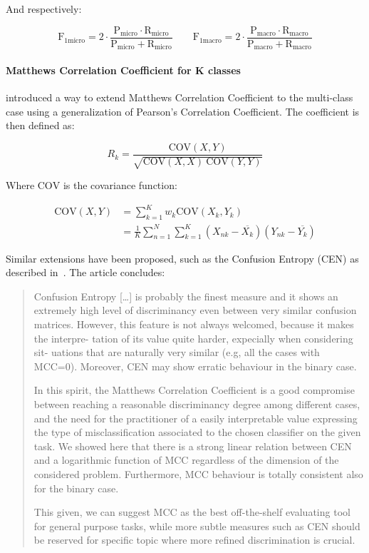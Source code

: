And respectively:

\begin{equation}
  \text{F}_{1 \text{micro}} = 2 \cdot \frac{\text{P}_{\text{micro}} \cdot \text{R}_{\text{micro}} }{\text{P}_{\text{micro}} + \text{R}_{\text{micro}} } \qquad
  \text{F}_{1 \text{macro}} = 2 \cdot \frac{\text{P}_{\text{macro}} \cdot \text{R}_{\text{macro}} }{\text{P}_{\text{macro}} + \text{R}_{\text{macro}} }
\end{equation}

\paragraph{Matthews Correlation Coefficient for K classes}
\label{par:Matthews Correlation Coefficient for K classes}

\cite{Gorodkin:2004aa} introduced a way to extend Matthews Correlation Coefficient to the multi-class case using a generalization of Pearson’s Correlation Coefficient. The coefficient is then defined as:

\begin{equation}
  R_k  = \frac{\text{COV}(X, Y)}{\sqrt{\text{COV}(X, X) \ \text{COV}(Y, Y)}}
\end{equation}

Where $\text{COV}$ is the covariance function:

\begin{align}
  \text{COV}(X, Y) &= \sum_{k=1}^K w_k \text{COV}(X_k, Y_k) \\
  &= \frac{1}{K} \sum_{n=1}^N \sum_{k=1}^K (X_{nk} - \overline{X_k})(Y_{nk} - \overline{Y_k})
\end{align}

Similar extensions have been proposed, such as the Confusion Entropy (CEN) as described in~\cite{Jurman:2012aa}. The article concludes:

\blockquote{Confusion Entropy [\ldots] is probably the finest measure and it shows an extremely high level of discriminancy even between very similar confusion matrices. However, this feature is not always welcomed, because it makes the interpre- tation of its value quite harder, expecially when considering sit- uations that are naturally very similar (e.g, all the cases with MCC=0). Moreover, CEN may show erratic behaviour in the binary case.

In this spirit, the Matthews Correlation Coefficient is a good compromise between reaching a reasonable discriminancy degree among different cases, and the need for the practitioner of a easily interpretable value expressing the type of misclassification associated to the chosen classifier on the given task. We showed here that there is a strong linear relation between CEN and a logarithmic function of MCC regardless of the dimension of the considered problem. Furthermore, MCC behaviour is totally consistent also for the binary case.

This given, we can suggest MCC as the best off-the-shelf evaluating tool for general purpose tasks, while more subtle measures such as CEN should be reserved for specific topic where more refined discrimination is crucial.}

